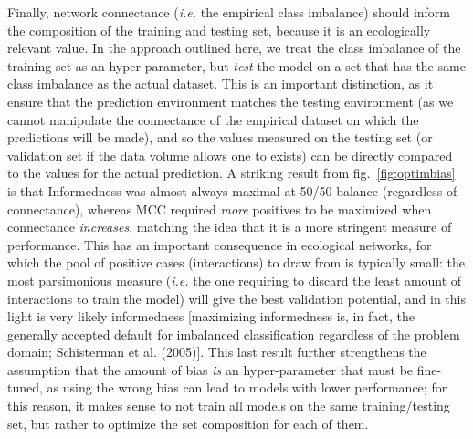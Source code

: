 \documentclass[11pt]{article}
\begin{document}
Finally, network connectance (\emph{i.e.} the empirical class imbalance)
should inform the composition of the training and testing set, because
it is an ecologically relevant value. In the approach outlined here, we
treat the class imbalance of the training set as an hyper-parameter, but
\emph{test} the model on a set that has the same class imbalance as the
actual dataset. This is an important distinction, as it ensure that the
prediction environment matches the testing environment (as we cannot
manipulate the connectance of the empirical dataset on which the
predictions will be made), and so the values measured on the testing set
(or validation set if the data volume allows one to exists) can be
directly compared to the values for the actual prediction. A striking
result from fig.~\ref{fig:optimbias} is that Informedness was almost
always maximal at 50/50 balance (regardless of connectance), whereas MCC
required \emph{more} positives to be maximized when connectance
\emph{increases}, matching the idea that it is a more stringent measure
of performance. This has an important consequence in ecological
networks, for which the pool of positive cases (interactions) to draw
from is typically small: the most parsimonious measure (\emph{i.e.} the
one requiring to discard the least amount of interactions to train the
model) will give the best validation potential, and in this light is
very likely informedness {[}maximizing informedness is, in fact, the
generally accepted default for imbalanced classification regardless of
the problem domain; Schisterman et al. (2005){]}. This last result
further strengthens the assumption that the amount of bias \emph{is} an
hyper-parameter that must be fine-tuned, as using the wrong bias can
lead to models with lower performance; for this reason, it makes sense
to not train all models on the same training/testing set, but rather to
optimize the set composition for each of them.
\end{document}
